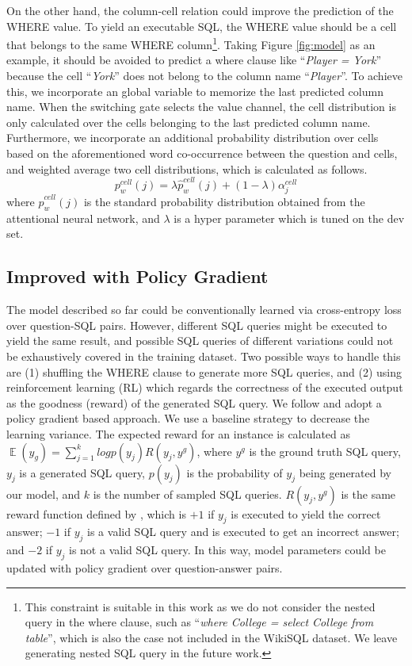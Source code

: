 \documentclass[11pt,a4paper]{article}
\begin{document}
On the other hand, the column-cell relation could improve the prediction of the WHERE value.
To yield an executable SQL, the WHERE value should be a cell that belongs to the same WHERE column\footnote{This constraint is suitable in this work as we do not consider the nested query in the where clause, such as ``\textit{where College = select College from table}'', which is also the case not included in the WikiSQL dataset. We leave generating nested SQL query in the future work.}.
Taking Figure \ref{fig:model} as an example, it should be avoided to predict a where clause like ``\textit{Player = York}'' because the cell ``\textit{York}'' does not belong to the column name ``\textit{Player}''.
To achieve this, we incorporate an global variable to memorize the last predicted column name. When the switching gate selects the value channel, the \mbox{cell} distribution is only calculated over the cells belonging to the last predicted column name.
Furthermore, we incorporate an additional probability distribution over cells based on the aforementioned word co-occurrence between the question and cells, and weighted average two cell distributions, which is calculated as follows.
\begin{equation}
p_w^{cell}(j) = \lambda \hat{p}_w^{cell}(j) + (1-\lambda) \alpha^{cell}_j
\end{equation}
where $\hat{p}_w^{cell}(j)$ is the standard probability distribution obtained from the attentional neural network, and $\lambda$ is a hyper parameter which is tuned on the dev set.




\subsection{Improved with Policy Gradient}
\label{section:improved-rl}
The model described so far could be conventionally learned via cross-entropy loss over question-SQL pairs.
However, different SQL queries might be executed to yield the same result, and possible SQL queries of different variations
could not be exhaustively covered in the training dataset.
Two possible ways to handle this are (1) shuffling the WHERE clause to generate more SQL queries, and (2) using 
reinforcement learning (\mbox{RL}) which 
regards the correctness of the executed output as the goodness (reward) of the generated SQL query.
We follow  and adopt a policy gradient based approach.
We use a baseline strategy \cite{zaremba2015reinforcement} to decrease the learning variance.
The expected reward \cite{williams1992simple} for an instance is calculated as $\mathop{\mathbb{E}}(y_g)=\sum_{j=1}^{k}logp(y_j) R(y_j, y^g)$, where $y^g$ is the ground truth SQL query, $y_j$ is a generated SQL query, $p(y_j)$ is the probability of $y_j$ being generated by our model, and $k$ is the number of sampled SQL queries.
$R(y_j, y^g)$ is the same reward function defined by , which is
$+1$ if $y_j$ is executed to yield the correct answer;
$-1$ if $y_j$ is a valid SQL query and is executed to get an incorrect answer;
and $-2$ if $y_j$ is not a valid SQL query.
In this way, model parameters could be updated
with policy gradient over question-answer pairs.
\end{document}
